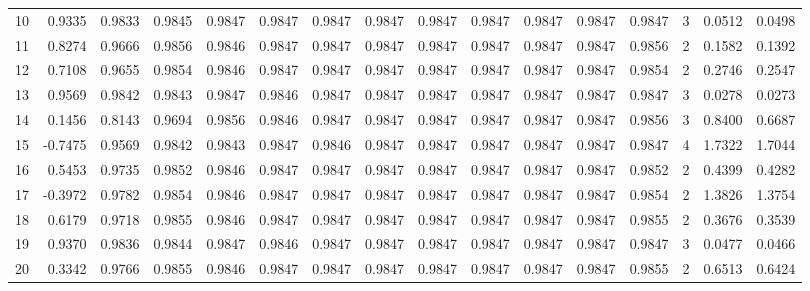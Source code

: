 \begin{tabular}{lrrrrrrrrrrrrrrr}
10  &      0.9335 &  0.9833 &  0.9845 &  0.9847 &  0.9847 &  0.9847 &  0.9847 &  0.9847 &  0.9847 &  0.9847 &   0.9847 &     0.9847 &      3 &                    0.0512 &                     0.0498 \\
11  &      0.8274 &  0.9666 &  0.9856 &  0.9846 &  0.9847 &  0.9847 &  0.9847 &  0.9847 &  0.9847 &  0.9847 &   0.9847 &     0.9856 &      2 &                    0.1582 &                     0.1392 \\
12  &      0.7108 &  0.9655 &  0.9854 &  0.9846 &  0.9847 &  0.9847 &  0.9847 &  0.9847 &  0.9847 &  0.9847 &   0.9847 &     0.9854 &      2 &                    0.2746 &                     0.2547 \\
13  &      0.9569 &  0.9842 &  0.9843 &  0.9847 &  0.9846 &  0.9847 &  0.9847 &  0.9847 &  0.9847 &  0.9847 &   0.9847 &     0.9847 &      3 &                    0.0278 &                     0.0273 \\
14  &      0.1456 &  0.8143 &  0.9694 &  0.9856 &  0.9846 &  0.9847 &  0.9847 &  0.9847 &  0.9847 &  0.9847 &   0.9847 &     0.9856 &      3 &                    0.8400 &                     0.6687 \\
15  &     -0.7475 &  0.9569 &  0.9842 &  0.9843 &  0.9847 &  0.9846 &  0.9847 &  0.9847 &  0.9847 &  0.9847 &   0.9847 &     0.9847 &      4 &                    1.7322 &                     1.7044 \\
16  &      0.5453 &  0.9735 &  0.9852 &  0.9846 &  0.9847 &  0.9847 &  0.9847 &  0.9847 &  0.9847 &  0.9847 &   0.9847 &     0.9852 &      2 &                    0.4399 &                     0.4282 \\
17  &     -0.3972 &  0.9782 &  0.9854 &  0.9846 &  0.9847 &  0.9847 &  0.9847 &  0.9847 &  0.9847 &  0.9847 &   0.9847 &     0.9854 &      2 &                    1.3826 &                     1.3754 \\
18  &      0.6179 &  0.9718 &  0.9855 &  0.9846 &  0.9847 &  0.9847 &  0.9847 &  0.9847 &  0.9847 &  0.9847 &   0.9847 &     0.9855 &      2 &                    0.3676 &                     0.3539 \\
19  &      0.9370 &  0.9836 &  0.9844 &  0.9847 &  0.9846 &  0.9847 &  0.9847 &  0.9847 &  0.9847 &  0.9847 &   0.9847 &     0.9847 &      3 &                    0.0477 &                     0.0466 \\
20  &      0.3342 &  0.9766 &  0.9855 &  0.9846 &  0.9847 &  0.9847 &  0.9847 &  0.9847 &  0.9847 &  0.9847 &   0.9847 &     0.9855 &      2 &                    0.6513 &                     0.6424 \\

\end{tabular}
